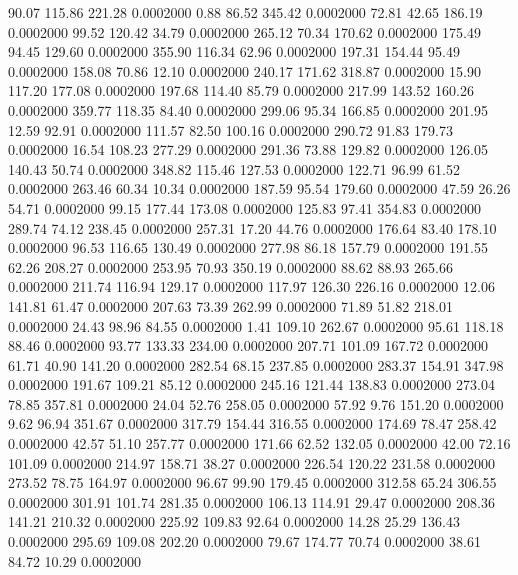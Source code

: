   90.07  115.86  221.28   0.0002000
   0.88   86.52  345.42   0.0002000
  72.81   42.65  186.19   0.0002000
  99.52  120.42   34.79   0.0002000
 265.12   70.34  170.62   0.0002000
 175.49   94.45  129.60   0.0002000
 355.90  116.34   62.96   0.0002000
 197.31  154.44   95.49   0.0002000
 158.08   70.86   12.10   0.0002000
 240.17  171.62  318.87   0.0002000
  15.90  117.20  177.08   0.0002000
 197.68  114.40   85.79   0.0002000
 217.99  143.52  160.26   0.0002000
 359.77  118.35   84.40   0.0002000
 299.06   95.34  166.85   0.0002000
 201.95   12.59   92.91   0.0002000
 111.57   82.50  100.16   0.0002000
 290.72   91.83  179.73   0.0002000
  16.54  108.23  277.29   0.0002000
 291.36   73.88  129.82   0.0002000
 126.05  140.43   50.74   0.0002000
 348.82  115.46  127.53   0.0002000
 122.71   96.99   61.52   0.0002000
 263.46   60.34   10.34   0.0002000
 187.59   95.54  179.60   0.0002000
  47.59   26.26   54.71   0.0002000
  99.15  177.44  173.08   0.0002000
 125.83   97.41  354.83   0.0002000
 289.74   74.12  238.45   0.0002000
 257.31   17.20   44.76   0.0002000
 176.64   83.40  178.10   0.0002000
  96.53  116.65  130.49   0.0002000
 277.98   86.18  157.79   0.0002000
 191.55   62.26  208.27   0.0002000
 253.95   70.93  350.19   0.0002000
  88.62   88.93  265.66   0.0002000
 211.74  116.94  129.17   0.0002000
 117.97  126.30  226.16   0.0002000
  12.06  141.81   61.47   0.0002000
 207.63   73.39  262.99   0.0002000
  71.89   51.82  218.01   0.0002000
  24.43   98.96   84.55   0.0002000
   1.41  109.10  262.67   0.0002000
  95.61  118.18   88.46   0.0002000
  93.77  133.33  234.00   0.0002000
 207.71  101.09  167.72   0.0002000
  61.71   40.90  141.20   0.0002000
 282.54   68.15  237.85   0.0002000
 283.37  154.91  347.98   0.0002000
 191.67  109.21   85.12   0.0002000
 245.16  121.44  138.83   0.0002000
 273.04   78.85  357.81   0.0002000
  24.04   52.76  258.05   0.0002000
  57.92    9.76  151.20   0.0002000
   9.62   96.94  351.67   0.0002000
 317.79  154.44  316.55   0.0002000
 174.69   78.47  258.42   0.0002000
  42.57   51.10  257.77   0.0002000
 171.66   62.52  132.05   0.0002000
  42.00   72.16  101.09   0.0002000
 214.97  158.71   38.27   0.0002000
 226.54  120.22  231.58   0.0002000
 273.52   78.75  164.97   0.0002000
  96.67   99.90  179.45   0.0002000
 312.58   65.24  306.55   0.0002000
 301.91  101.74  281.35   0.0002000
 106.13  114.91   29.47   0.0002000
 208.36  141.21  210.32   0.0002000
 225.92  109.83   92.64   0.0002000
  14.28   25.29  136.43   0.0002000
 295.69  109.08  202.20   0.0002000
  79.67  174.77   70.74   0.0002000
  38.61   84.72   10.29   0.0002000

